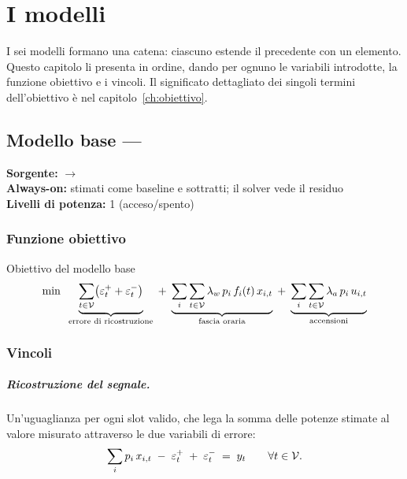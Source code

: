 \chapter{I modelli}
\label{ch:modelli}

I sei modelli formano una catena: ciascuno estende il precedente con un elemento. Questo capitolo
li presenta in ordine, dando per ognuno le variabili introdotte, la funzione obiettivo e i vincoli.
Il significato dettagliato dei singoli termini dell'obiettivo è nel capitolo~\ref{ch:obiettivo}.

\section{Modello base --- }
\label{sec:m1}

\noindent\textbf{Sorgente:}  $\rightarrow$ \\
\textbf{Always-on:} stimati come baseline e sottratti; il solver vede il residuo\\
\textbf{Livelli di potenza:} 1 (acceso/spento)

\subsection*{Funzione obiettivo}

\begin{modelbox}{Obiettivo del modello base}
\begin{equation}
  \min \;\;
  \underbrace{\sum_{t \in \mathcal{V}} \bigl( \varepsilon^{+}_t + \varepsilon^{-}_t \bigr)}_{\text{errore di ricostruzione}}
  \;+\;
  \underbrace{\sum_{i} \sum_{t \in \mathcal{V}} \lambda_w \, p_i \, f_i(t) \, x_{i,t}}_{\text{fascia oraria}}
  \;+\;
  \underbrace{\sum_{i} \sum_{t \in \mathcal{V}} \lambda_a \, p_i \, u_{i,t}}_{\text{accensioni}}
\end{equation}
\end{modelbox}

\subsection*{Vincoli}

\paragraph{Ricostruzione del segnale.} Un'uguaglianza per ogni slot valido, che lega la somma
delle potenze stimate al valore misurato attraverso le due variabili di errore:
\begin{equation}
  \sum_{i} p_i \, x_{i,t} \;-\; \varepsilon^{+}_t \;+\; \varepsilon^{-}_t \;=\; y_t
  \qquad \forall t \in \mathcal{V} .
  \label{eq:ricostruzione-base}
\end{equation}

